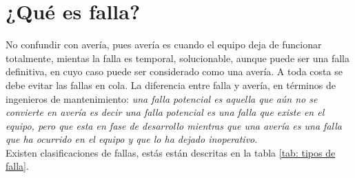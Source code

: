 \documentclass[
	12pt, %
	fleqn, %
	a4paper, %
	oneside, %
]{LegrandOrangeBook}
\begin{document}
\section{¿Qué es falla?}
No confundir con avería, pues avería es cuando el equipo deja de funcionar totalmente, mientas la falla es temporal, solucionable, aunque puede ser una falla definitiva, en cuyo caso puede ser considerado como una avería. A toda costa se debe evitar las fallas en cola. 
La diferencia entre falla y avería, en términos de ingenieros de mantenimiento: \emph{una falla potencial es aquella que aún no se convierte en avería es decir una falla potencial es una falla que existe en el equipo, pero que esta en fase de desarrollo mientras que una avería es una falla que ha ocurrido en el equipo y que lo ha dejado inoperativo}.\\
Existen clasificaciones de fallas, estás están descritas en la tabla \ref{tab: tipos de falla}.
\end{document}
